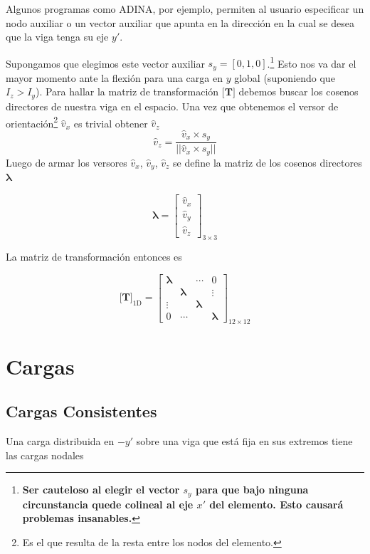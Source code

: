 \documentclass[11pt, a4paper,titlepage]{article}
\newcommand{\Adina}{{\sc ADINA}}
\newcommand{\Mme}[1]{\boldsymbol{[}\mathbf{#1} \boldsymbol{]}}
\newcommand{\feaPP}{null.tex}
\begin{document}
Algunos programas como \Adina, por ejemplo, permiten al usuario especificar un nodo auxiliar o un vector auxiliar que apunta en la dirección en la cual se desea que la viga tenga su eje $y'$. 

Supongamos que elegimos este vector auxiliar $s_y=[0,1,0]$.\footnote{\textbf{Ser cauteloso al elegir el vector $s_y$ para que bajo ninguna circunstancia quede colineal al eje $x'$ del elemento. Esto causará problemas insanables.}} Esto nos va dar el mayor momento ante la flexión para una carga en $y$ global (suponiendo que $I_z>I_y$).
 \newcommand{\versor}[1]{\hat{#1}}
Para hallar la matriz de transformación $\Mme{T}$ debemos buscar los cosenos directores de nuestra viga en el espacio. Una vez que obtenemos el versor de orientación\footnote{Es el que resulta de la resta entre los nodos del elemento.} $\versor{v}_x$ es trivial obtener $\versor{v}_z$
\[
\versor{v}_z = \frac{\versor{v}_x\times s_y}{||\versor{v}_x\times s_y||}
\]
Luego de armar los versores $\versor{v}_x$, $\versor{v}_y$, $\versor{v}_z$ se define la matriz de los cosenos directores $\pmb{\lambda}$

\[
\pmb{\lambda} = \begin{bmatrix}
\versor{v}_x \\
\versor{v}_y \\
\versor{v}_z 
\end{bmatrix}_{3\times3}
\]

La matriz de transformación entonces es

\begin{equation}
	\Mme{T}_{\mathrm{1D}}=\begin{bmatrix}
	\pmb{\lambda} & &\cdots & 0 \\
	 &\pmb{\lambda} &  &\vdots \\
	\vdots & &\pmb{\lambda} & \\
	0 &\cdots & & \pmb{\lambda}
	\end{bmatrix}_{12\times 12}
\end{equation}


\section{Cargas}
\subsection*{Cargas Consistentes}
Una carga distribuida en $-y'$ sobre una viga que está fija en sus extremos tiene las cargas nodales
\end{document}
